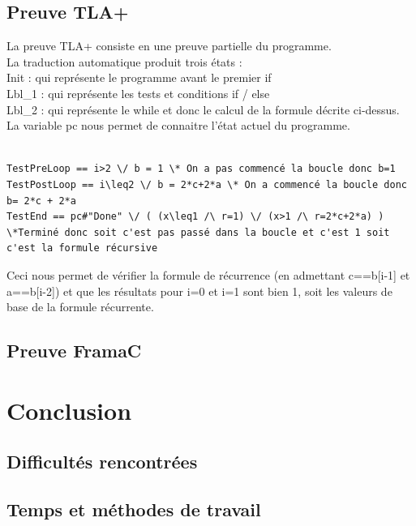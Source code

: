 \documentclass{scrreprt}
\begin{document}
\section{Preuve TLA+}
La preuve TLA+ consiste en une preuve partielle du programme.\\
La traduction automatique produit trois états :\\
Init : qui représente le programme avant le premier if\\
Lbl_1 : qui représente les tests et conditions if / else\\
Lbl_2 : qui représente le while et donc le calcul de la formule décrite ci-dessus.\\
La variable pc nous permet de connaitre l'état actuel du programme.\\
\\
\begin{lstlisting}
TestPreLoop == i>2 \/ b = 1 \* On a pas commencé la boucle donc b=1
TestPostLoop == i\leq2 \/ b = 2*c+2*a \* On a commencé la boucle donc b= 2*c + 2*a
TestEnd == pc#"Done" \/ ( (x\leq1 /\ r=1) \/ (x>1 /\ r=2*c+2*a) ) \*Terminé donc soit c'est pas passé dans la boucle et c'est 1 soit c'est la formule récursive
\end{lstlisting}

Ceci nous permet de vérifier la formule de récurrence (en admettant c==b[i-1] et a==b[i-2]) et que les résultats pour i=0 et i=1 sont bien 1, soit les valeurs de base de la formule récurrente.

\section{Preuve FramaC}

%
%
%

\chapter{Conclusion}


\section{Difficultés rencontrées}

\section{Temps et méthodes de travail}
\end{document}
